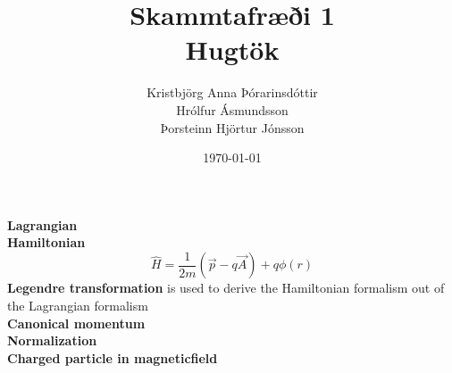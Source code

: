 \documentclass[12pt,a4paper]{report}
\begin{document}
\title{Skammtafræði 1\\ Hugtök}
\date{\today}
\author{Kristbjörg Anna Þórarinsdóttir\\Hrólfur Ásmundsson\\ Þorsteinn Hjörtur Jónsson}
\maketitle









\textbf{Lagrangian}\\
\textbf{Hamiltonian}\\
\[\hat{H} = \frac{1}{2m}\left( \vec{p} - q\vec{A} \right) + q\phi (r) \]
\textbf{Legendre transformation} is used to derive the Hamiltonian formalism out of the Lagrangian formalism \\ 
\textbf{Canonical momentum}\\
\textbf{Normalization}\\
\textbf{Charged particle in magneticfield} 
\end{document}
